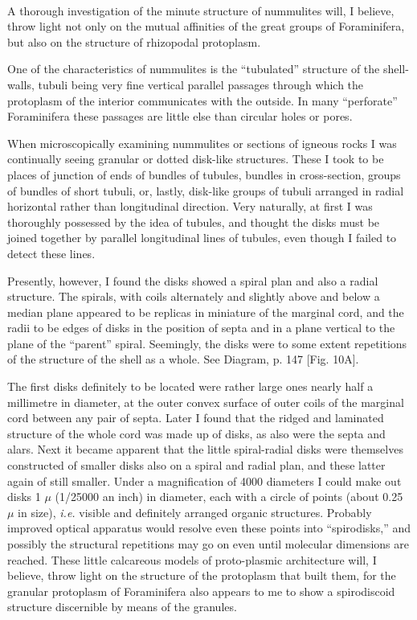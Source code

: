 \documentclass[a4paper, 12pt, oneside]{article}
\begin{document}
\paragraph{}
A thorough investigation of the minute structure of nummulites will, I believe, throw light not only on the mutual affinities of the great groups of Foraminifera, but also on the structure of rhizopodal protoplasm.

One of the characteristics of nummulites is the ``tubulated'' structure of the shell-walls, tubuli being very fine vertical parallel passages through which the protoplasm of the interior communicates with the outside. In many ``perforate'' Foraminifera these passages are little else than circular holes or pores.

When microscopically examining nummulites or sections of igneous rocks I was continually seeing granular or dotted disk-like structures. These I took to be places of junction of ends of bundles of tubules, bundles in cross-section, groups of bundles of short tubuli, or, lastly, disk-like groups of tubuli arranged in radial horizontal rather than longitudinal direction. Very naturally, at first I was thoroughly possessed by the idea of tubules, and thought the disks must be joined together by parallel longitudinal lines of tubules, even though I failed to detect these lines.

Presently, however, I found the disks showed a spiral plan and also a radial structure. The spirals, with coils alternately and slightly above and below a median plane appeared to be replicas in miniature of the marginal cord, and the radii to be edges of disks in the position of septa and in a plane vertical to the plane of the ``parent'' spiral. Seemingly, the disks were to some extent repetitions of the structure of the shell as a whole. See Diagram, p. 147 [Fig. 10A].

The first disks definitely to be located were rather large ones nearly half a millimetre in diameter, at the outer convex surface of outer coils of the marginal cord between any pair of septa. Later I found that the ridged and laminated structure of the whole cord was made up of disks, as also were the septa and alars. Next it became apparent that the little spiral-radial disks were themselves constructed of smaller disks also on a spiral and radial plan, and these latter again of still smaller. Under a magnification of 4000 diameters I could make out disks 1 $\mu$ (1/25000 an inch) in diameter, each with a circle of points (about 0.25 $\mu$ in size), \emph{i.e.} visible and definitely arranged organic structures. Probably improved optical apparatus would resolve even these points into ``spirodisks,'' and possibly the structural repetitions may go on even until molecular dimensions are reached. These little calcareous models of proto-plasmic architecture will, I believe, throw light on the structure of the protoplasm that built them, for the granular protoplasm of Foraminifera also appears to me to show a spirodiscoid structure discernible by means of the granules.
\end{document}
